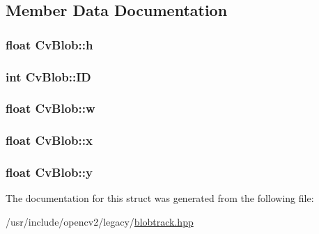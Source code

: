 \subsection{Member Data Documentation}
\hypertarget{structCvBlob_a9804e5eccb3e2db67fd953e9448c92ab}{
\subsubsection[{h}]{\setlength{\rightskip}{0pt plus 5cm}float Cv\-Blob\-::h}}\label{structCvBlob_a9804e5eccb3e2db67fd953e9448c92ab}
\hypertarget{structCvBlob_a16df7a5bab3b565d73b4dd6dea7f0bbc}{
\subsubsection[{I\-D}]{\setlength{\rightskip}{0pt plus 5cm}int Cv\-Blob\-::\-I\-D}}\label{structCvBlob_a16df7a5bab3b565d73b4dd6dea7f0bbc}
\hypertarget{structCvBlob_ab54077d5cb25eda9c933f985aef9fe2e}{
\subsubsection[{w}]{\setlength{\rightskip}{0pt plus 5cm}float Cv\-Blob\-::w}}\label{structCvBlob_ab54077d5cb25eda9c933f985aef9fe2e}
\hypertarget{structCvBlob_a1a485b2d61f71da5aa10d905a1de8214}{
\subsubsection[{x}]{\setlength{\rightskip}{0pt plus 5cm}float Cv\-Blob\-::x}}\label{structCvBlob_a1a485b2d61f71da5aa10d905a1de8214}
\hypertarget{structCvBlob_a91c35a2520d1596140c47c51a3a5ae17}{
\subsubsection[{y}]{\setlength{\rightskip}{0pt plus 5cm}float Cv\-Blob\-::y}}\label{structCvBlob_a91c35a2520d1596140c47c51a3a5ae17}


The documentation for this struct was generated from the following file\-:\begin{DoxyCompactItemize}
\item 
/usr/include/opencv2/legacy/\hyperlink{blobtrack_8hpp}{blobtrack.\-hpp}\end{DoxyCompactItemize}
